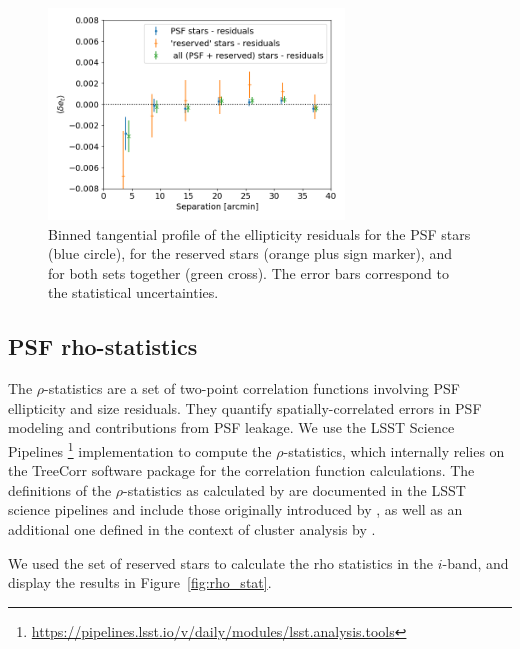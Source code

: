 \documentclass[SE,lsstdraft,authoryear,toc]{lsstdoc}
\begin{document}
\begin{figure}
\centering
\includegraphics[width=0.7\textwidth]{Figures/residual_tan_profile_CLMM.png}
\caption{Binned tangential profile of the ellipticity residuals for the PSF stars (blue circle), for the reserved stars (orange plus sign marker), and for both sets together (green cross). The error bars correspond to the statistical uncertainties.\label{fig:res_profile}}
\end{figure}


\subsection{PSF rho-statistics}
The $\rho$-statistics \citep{2010MNRAS.404..350R, 2016MNRAS.460.2245J} are a set of two-point correlation functions involving PSF ellipticity and size residuals. They quantify spatially-correlated errors in PSF modeling and contributions from PSF leakage. We use the LSST Science Pipelines \footnote{\url{https://pipelines.lsst.io/v/daily/modules/lsst.analysis.tools}} implementation to compute the $\rho$-statistics, which internally relies on the TreeCorr software package \citep{2015ascl.soft08007J} for the correlation function calculations. The definitions of the $\rho$-statistics as calculated by  are documented in the LSST science pipelines and include those originally introduced by \citet{2010MNRAS.404..350R, 2016MNRAS.460.2245J}, as well as an additional one defined in the context of cluster analysis by \citet{2015MNRAS.449.2219M}.

We used the set of reserved stars to calculate the rho statistics in the $i$-band, and display the results in Figure~\ref{fig:rho_stat}.
\end{document}

